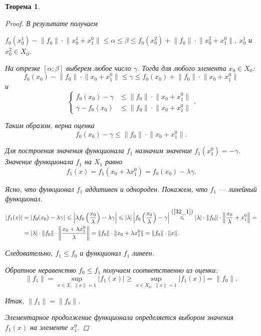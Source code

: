 \documentclass[12pt,a4paper,titlepage,oneside]{book}
\theoremstyle{definition}
\theoremstyle{plain}
\newtheorem*{theorem}{Теорема}
\theoremstyle{remark}
\theoremstyle{remark}
\theoremstyle{remark}
\theoremstyle{remark}
\theoremstyle{plain}
\theoremstyle{plain}
\begin{document}
\begin{theorem}
\begin{proof}
В результате получаем
\begin{center}
$f_0(x_0^1)-\lVert f_0 \rVert \cdot \lVert x_0^1+x_1^0 \rVert \leqslant \alpha \leqslant \beta \leqslant f_0(x_0^2)+\lVert f_0 \rVert \cdot \lVert x_0^2+x_1^0 \rVert$, $x_0^1$ и $x_0^2 \in X_0$.
\end{center}

На отрезке $[\alpha ; \beta]$ выберем любое число $\gamma$. Тогда для любого элемента $x_0 \in X_0$:
$$f_0(x_0)-\lVert f_0 \rVert \cdot \lVert x_0+x_1^0 \rVert \leqslant \gamma \leqslant f_0(x_0)+\lVert f_0 \rVert \cdot \lVert x_0+x_1^0 \rVert$$
и
$$
\begin{cases}
    f_0(x_0)-\gamma &\leqslant \lVert f_0 \rVert \cdot \lVert x_0+x_1^0 \rVert\\
    \gamma - f_0(x_0) &\leqslant \lVert f_0 \rVert \cdot \lVert x_0+x_1^0 \rVert
\end{cases}.
$$

Таким образом, верна оценка
\begin{equation}
\label{32_1}
f_0(x_0)-\gamma \leqslant \lVert f_0 \rVert \cdot \lVert x_0+x_1^0 \rVert.
\end{equation}

Для построения значения функционала $f_1$ назначим значение $f_1(x_1^0)=-\gamma$. Значение функционала $f_1$ на $X_1$ равно
$$ f_1(x)=f_1(x_0+ \lambda x_1^0)=f_0(x_0)-\lambda \gamma.$$

Ясно, что функционал $f_1$ аддитивен и однороден. Покажем, что $f_1$ --- линейный функционал.
\begin{align*}
|f_1(x)| &= |f_0(x_0)-\lambda \gamma| \leqslant \left|\lambda f_0\left(\frac{x_0}{\lambda}\right)-\lambda \gamma\right| \leqslant
|\lambda| \left|f_0\left(\frac{x_0}{\lambda}\right)- \gamma\right| \overset{\mbox{(\ref{32_1})}}{\leqslant} |\lambda|\cdot \lVert f_0 \rVert \cdot \left \lVert \frac{x_0}{\lambda} + x_1^0 \right \rVert =\\
&= \lvert \lambda \rvert \cdot \lVert f_0 \rVert \cdot \left \lVert \frac{x_0+\lambda x_1^0}{\lambda} \right \rVert = \lVert f_0 \rVert \cdot  \lVert x_0+\lambda x_1^0 \rVert = \lVert f_0 \rVert \cdot  \lVert x \rVert.
\end{align*}

Следовательно, $f_1 \leqslant f_0$ и функционал $f_1$ линеен.

Обратное неравенство $f_0 \leqslant f_1$ получаем соответственно из оценки:
$$ \lVert f_1 \rVert=\underset{x \in X, \; \lVert x \rVert = 1 }{\sup} |f_1(x)| \geqslant \underset{x \in X_0, \; \lVert x \rVert = 1 }{\sup} |f_1(x)|=\lVert f_0 \rVert.$$

Итак, $\lVert f_1 \rVert=\lVert f_0 \rVert$.

Элементарное продолжение функционала определяется выбором значения $f_1(x)$ на элементе $x_1^0$.
\end{proof}
\end{theorem}
\end{document}
